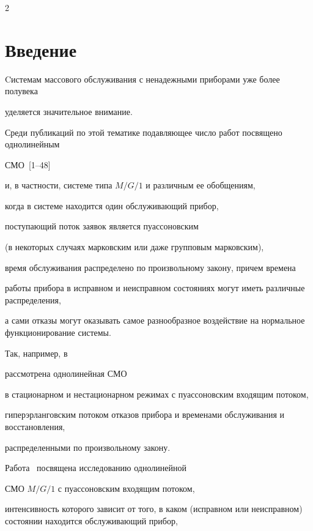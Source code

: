       \begin{multicols}{2}





      \label{st\stat}





\section{Введение}





Cистемам массового обслуживания с ненадежными приборами уже более полувека


уделяется значительное внимание.


Среди публикаций по этой тематике подавляющее число работ посвящено однолинейным


СМО~[1--48]


и, в частности, системе типа $M/G/1$ и различным ее обобщениям,


когда в системе находится один обслуживающий прибор,


поступающий поток заявок является пуассоновским


(в некоторых случаях марковским или даже групповым марковским),


время обслуживания распределено по произвольному закону, причем времена


работы прибора в исправном и неисправном состояниях могут иметь различные распределения,


а сами отказы могут оказывать самое разнообразное воздействие на нормальное функционирование системы.


Так, например, в~\cite{Mikadze-Khocholava-Khurodze_2003, Mikadze-Khocholava-Khurodze_2004, Mikadze-Khocholava_2005}


рассмотрена однолинейная СМО


в стационарном и нестационарном режимах с пуассоновским входящим потоком,


гиперэрланговским потоком отказов прибора и временами обслуживания и восстановления,


распределенными по произвольному закону.


Работа~\cite{Kotlyar_1995} посвящена исследованию однолинейной


СМО $M/G/1$ с пуассоновским входящим потоком,


интенсивность которого зависит от того, в каком (исправном или неисправном) состоянии находится обслуживающий прибор,



\end{multicols}

